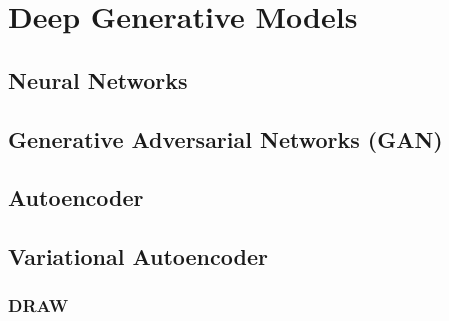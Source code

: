 
\chapter{Deep Generative Models}

\section{Neural Networks}
\section{Generative Adversarial Networks (GAN)}
\section{Autoencoder}
\section{Variational Autoencoder}
\subsection{DRAW}

